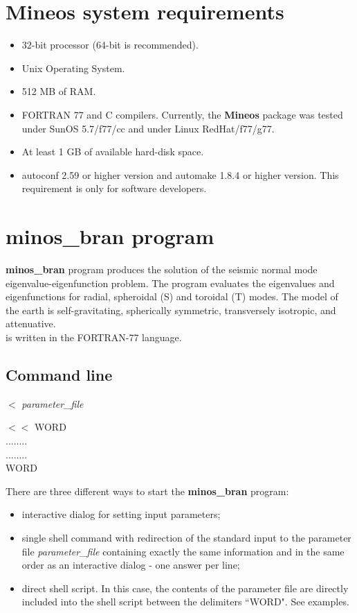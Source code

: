 \documentclass[11pt]{article}
\begin{document}
\section{{\bf Mineos} system requirements}
\begin{itemize}
\item 32-bit processor (64-bit is recommended).
\item Unix Operating System.
\item 512 MB of RAM.
\item FORTRAN 77 and C compilers. Currently, the {\bf Mineos} package was
tested under SunOS 5.7/f77/cc and under Linux RedHat/f77/g77.
\item At least 1 GB of available hard-disk space.
\item autoconf 2.59 or higher version and automake 1.8.4 or higher version.
This requirement is only for software developers.
\end{itemize}

\section {minos\_bran program}

{\bf minos\_bran} program produces the solution of the seismic normal mode
eigenvalue-eigenfunction problem.
The program evaluates the eigenvalues and eigenfunctions for radial, spheroidal (S) and
toroidal (T) modes. The model of the earth is  self-gravitating, spherically
symmetric, transversely isotropic, and attenuative. \\
 is written in the FORTRAN-77 language.
\subsection {Command line}


 $<$ {\it parameter\_file}

 $<<$ WORD \\
\noindent ........  \\
\noindent ........  \\
\noindent WORD

\noindent There are three different ways to start the {\bf minos\_bran} program:
\begin{itemize}
\item interactive dialog for setting input parameters;
\item single shell command with redirection of the standard input to the parameter
file {\it parameter\_file} containing exactly the same information and
in the same order as an interactive dialog - one answer per line;
\item direct shell script. In this case, the contents of the parameter file are 
directly included into the shell script between the delimiters ``WORD". See examples.
\end{itemize}
\end{document}
